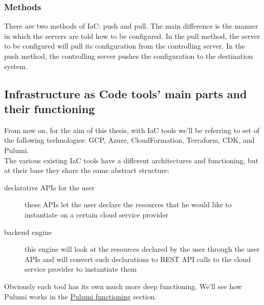 \subsubsection{Methods}

There are two methods of IaC: push and pull.
The main difference is the manner in which the servers are told how to be configured.
In the pull method, the server to be configured will pull its configuration from the controlling server.
In the push method, the controlling server pushes the configuration to the destination system.

\subsection{Infrastructure as Code tools' main parts and their functioning}
From now on, for the aim of this thesis, with IaC tools we'll be referring to set of the following technologies: \gls{GCP}, \gls{Azure}, \gls{CloudFormation}, \gls{Terraform}, \gls{CDK}, and Pulumi.\\
The various existing IaC tools have a different architectures and functioning, but at their base they share the same abstract structure:
\begin{description}
  \item[declarative APIs for the user] these APIs let the user declare the resources that he would like to instantiate on a certain cloud service provider
  \item[backend engine] this engine will look at the resources declared by the user through the user APIs and will convert such declarations to REST API calls to the cloud service provider to instantiate them 
\end{description}
Obviously each tool has its own much more deep functioning.
We'll see how Pulumi works in the \hyperref[sec:pulumi-functioning]{Pulumi functioning} section.



